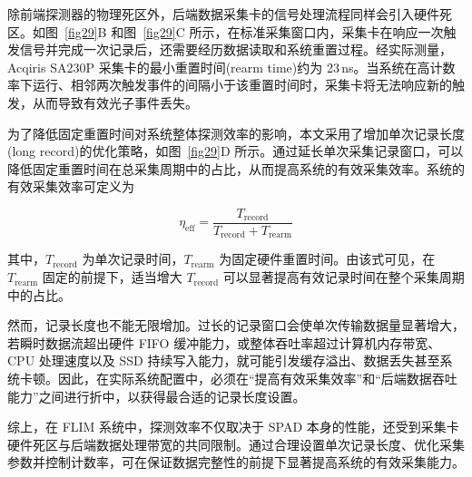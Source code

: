 除前端探测器的物理死区外，后端数据采集卡的信号处理流程同样会引入硬件死区。如图~\ref{fig29}B 和图~\ref{fig29}C 所示，在标准采集窗口内，采集卡在响应一次触发信号并完成一次记录后，还需要经历数据读取和系统重置过程。经实际测量，Acqiris SA230P 采集卡的最小重置时间(rearm time)约为 23\,ns。当系统在高计数率下运行、相邻两次触发事件的间隔小于该重置时间时，采集卡将无法响应新的触发，从而导致有效光子事件丢失。


为了降低固定重置时间对系统整体探测效率的影响，本文采用了增加单次记录长度(long record)的优化策略，如图~\ref{fig29}D 所示。通过延长单次采集记录窗口，可以降低固定重置时间在总采集周期中的占比，从而提高系统的有效采集效率。系统的有效采集效率可定义为

\begin{equation}
  \eta_{\mathrm{eff}} = \frac{T_{\mathrm{record}}}{T_{\mathrm{record}} + T_{\mathrm{rearm}}}
\end{equation}

其中，$T_{\mathrm{record}}$ 为单次记录时间，$T_{\mathrm{rearm}}$ 为固定硬件重置时间。由该式可见，在 $T_{\mathrm{rearm}}$ 固定的前提下，适当增大 $T_{\mathrm{record}}$ 可以显著提高有效记录时间在整个采集周期中的占比。

然而，记录长度也不能无限增加。过长的记录窗口会使单次传输数据量显著增大，若瞬时数据流超出硬件 FIFO 缓冲能力，或整体吞吐率超过计算机内存带宽、CPU 处理速度以及 SSD 持续写入能力，就可能引发缓存溢出、数据丢失甚至系统卡顿。因此，在实际系统配置中，必须在``提高有效采集效率''和``后端数据吞吐能力''之间进行折中，以获得最合适的记录长度设置。

综上，在 FLIM 系统中，探测效率不仅取决于 SPAD 本身的性能，还受到采集卡硬件死区与后端数据处理带宽的共同限制。通过合理设置单次记录长度、优化采集参数并控制计数率，可在保证数据完整性的前提下显著提高系统的有效采集能力。


